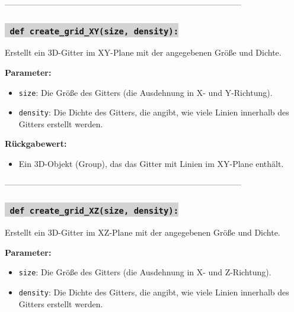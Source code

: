--------------------------------------------------------------------------------------

\subsubsection*{\colorbox{lightgray}{\texttt{\textbf{\color{green} def} \color{blue} create\_grid\_XY}\textbf{\texttt{(size, density):}}}}
Erstellt ein 3D-Gitter im XY-Plane mit der angegebenen Größe und Dichte.

\noindent \textbf{Parameter:} \vspace{-6ex} \\
\begin{itemize}
    \setlength{\itemindent}{1em}
    \item \texttt{size}: Die Größe des Gitters (die Ausdehnung in X- und Y-Richtung).
    \item \texttt{density}: Die Dichte des Gitters, die angibt, wie viele Linien innerhalb des Gitters erstellt werden.
\end{itemize}

\noindent \textbf{Rückgabewert:} \vspace{-6ex} \\
\begin{itemize}
    \setlength{\itemindent}{1em}
    \item Ein 3D-Objekt (Group), das das Gitter mit Linien im XY-Plane enthält.
\end{itemize}

--------------------------------------------------------------------------------------

\subsubsection*{\colorbox{lightgray}{\texttt{\textbf{\color{green} def} \color{blue} create\_grid\_XZ}\textbf{\texttt{(size, density):}}}}
Erstellt ein 3D-Gitter im XZ-Plane mit der angegebenen Größe und Dichte.

\noindent \textbf{Parameter:} \vspace{-6ex} \\
\begin{itemize}
    \setlength{\itemindent}{1em}
    \item \texttt{size}: Die Größe des Gitters (die Ausdehnung in X- und Z-Richtung).
    \item \texttt{density}: Die Dichte des Gitters, die angibt, wie viele Linien innerhalb des Gitters erstellt werden.
\end{itemize}

